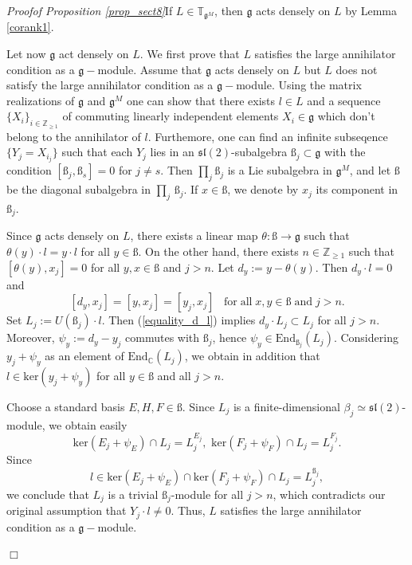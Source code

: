 \documentclass{svmult}
\renewenvironment{proof}{ \emph{Proof}}{$\Box$}
\newcommand {\ZZ} {\mathbb {Z}}
\newcommand {\CC} {\mathbb {C}}
\newcommand{\TT}{\mathbb{T}}
\renewcommand{\sl}{\mathfrak{sl}}
\renewcommand{\gg}{\mathfrak{g}}
\newcommand{\Ker}{\mathrm{ker}}
\newcommand{\End}{\mathrm{End}}
\begin{document}
\vspace{0.3cm}

\begin{proof}\textit{of Proposition \ref{prop_sect8}}\hspace{0.2cm}If $L \in \TT_{\gg^M}$, then $\gg$ acts densely on $L$ by Lemma \ref{corank1}. 

Let now $\gg$ act densely on $L$. We first prove that $L$ satisfies the large annihilator condition as a $\gg-$module. 
Assume that $\gg$ acts densely on $L$ but $L$ does not satisfy the large annihilator condition as a $\gg-$module. Using the matrix realizations of $\gg$ and $\gg^M$
one can show that there exists $l\in L$ and a sequence $\lbrace X_i\rbrace_{i\in\ZZ_{\geq 1}}$ of commuting linearly independent elements  $X_i\in\gg$
which don't belong to the annihilator of $l$. Furthemore, 
one can find an infinite subseqence $\lbrace Y_j=X_{i_j} \rbrace$ such that each $Y_j$ lies in an $\sl(2)$-subalgebra
$\text{\ss}_j\subset\gg$ with the condition
$[\text{\ss}_j,\text{\ss}_s]=0$ for $j\neq s$. Then $\prod_j \text{\ss}_j$ is a Lie subalgebra in $\gg^M$, and let $\text{\ss}$ be the diagonal subalgebra in $\prod_j\,\text{\ss}_j$. 
If $x\in\text{\ss}$, we denote by $x_j$ its component in $\text{\ss}_j$.

Since $\gg$ acts densely on $L$, there exists a linear map $\theta:\text{\ss}\to \gg$ such that $\theta(y)\cdot l=y\cdot l$ for all $y\in\text{\ss}$. 
On the other hand, there exists $n \in \ZZ_{\geq 1}$ such that
$[\theta(y),x_j]=0$ for all $y,x\in\text{\ss}$ and $j>n$. Let $d_y:=y-\theta(y)$. Then $d_y\cdot l=0$ and 
\begin{equation}\label{equality_d_l}
[d_y,x_j]=[y,x_j]=[y_j,x_j]\;\;\;\mathrm{for\;all}\;x,y\in\text{\ss}\;\mathrm{and}\;j>n.
\end{equation}           
Set $L_j:=U(\text{\ss}_j)\cdot l$. Then (\ref{equality_d_l}) implies $d_y\cdot L_j \subset L_j$ for all $j>n$.  
Moreover, $\psi_y:=d_y-y_j$ commutes with $\text{\ss}_j$, hence $\psi_y\in\End_{\text{\ss}_j}(L_j)$. 
Considering $y_j + \psi_y$ as an element of $\End_{\CC}(L_j)$, we obtain in addition that $l\in\Ker (y_j+\psi_y)$ for all $y\in\text{\ss}$ and all $j>n$. 

Choose a standard basis $E,H,F\in\text{\ss}$. Since $L_j$ is a finite-dimensional $\beta_j\simeq\sl(2)$-module, 
we obtain easily
$$\Ker(E_j+\psi_E)\cap L_j=L_j^{E_j},\,\, \Ker(F_j+\psi_F)\cap L_j=L_j^{F_j}.$$
Since
$$l \in \Ker(E_j+\psi_E)\cap \Ker(F_j+\psi_F)\cap L_j=L_j^{\text{\ss}_j},$$ 
we conclude that $L_j$ is a trivial  $\text{\ss}_j$-module for all $j>n$, which contradicts our original assumption that $Y_j\cdot l\neq 0$. 
Thus, $L$ satisfies the large annihilator condition as a $\gg-$module.


\end{proof}
\end{document}

